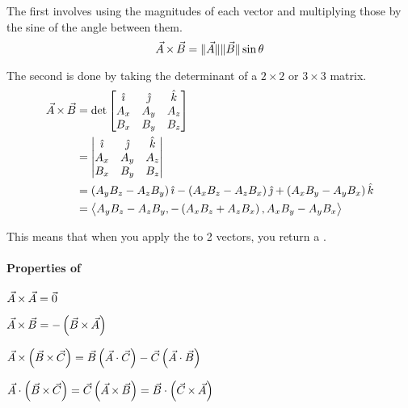 The first involves using the magnitudes of each vector and multiplying those by the sine of the angle between them.
\begin{equation}\label{eq:Cross Product Magnitudes}
  \vec{A} \operatorname{\times} \vec{B} = \lVert \vec{A} \rVert \lVert \vec{B} \rVert \sin \theta
\end{equation}

The second is done by taking the determinant of a $2 \times 2$ or $3 \times 3$ matrix.
\begin{equation}\label{eq:Cross Product Determinant}
  \begin{aligned}
    \vec{A} \operatorname{\times} \vec{B}
    &= \det \begin{bmatrix}
      \hat{\imath} & \hat{\jmath} & \hat{k} \\
      A_{x} & A_{y} & A_{z} \\
      B_{x} & B_{y} & B_{z}
    \end{bmatrix} \\
    &= \begin{vmatrix}
      \hat{\imath} & \hat{\jmath} & \hat{k} \\
      A_{x} & A_{y} & A_{z} \\
      B_{x} & B_{y} & B_{z}
    \end{vmatrix} \\
    &= \left( A_{y}B_{z}-A_{z}B_{y} \right) \hat{\imath} - \left( A_{x}B_{z}-A_{z}B_{x} \right) \hat{\jmath} + \left( A_{x}B_{y} - A_{y}B_{x} \right) \hat{k} \\
    &= \bigl\langle A_{y}B_{z}-A_{z}B_{y}, - \left( A_{x}B_{z}+A_{z}B_{x} \right), A_{x}B_{y}-A_{y}B_{x} \bigr\rangle
  \end{aligned}
\end{equation}

\begin{remark*}
  This means that when you apply the  to 2 vectors, you return a .
\end{remark*}

\paragraph{Properties of }\label{par:Cross Product Properties}
\begin{propertylist}
  \item $\vec{A} \operatorname{\times} \vec{A} = \vec{0}$
  \item $\vec{A} \operatorname{\times} \vec{B} = - \left( \vec{B} \operatorname{\times} \vec{A} \right)$
  \item $\vec{A} \operatorname{\times} \left( \vec{B} \operatorname{\times} \vec{C} \right) = \vec{B} \left( \vec{A} \cdot \vec{C}\right) - \vec{C} \left( \vec{A} \cdot \vec{B} \right)$
  \item $\vec{A} \cdot \left( \vec{B} \operatorname{\times} \vec{C} \right) = \vec{C} \left( \vec{A} \operatorname{\times} \vec{B} \right) = \vec{B} \cdot \left( \vec{C} \operatorname{\times} \vec{A} \right)$
\end{propertylist}
